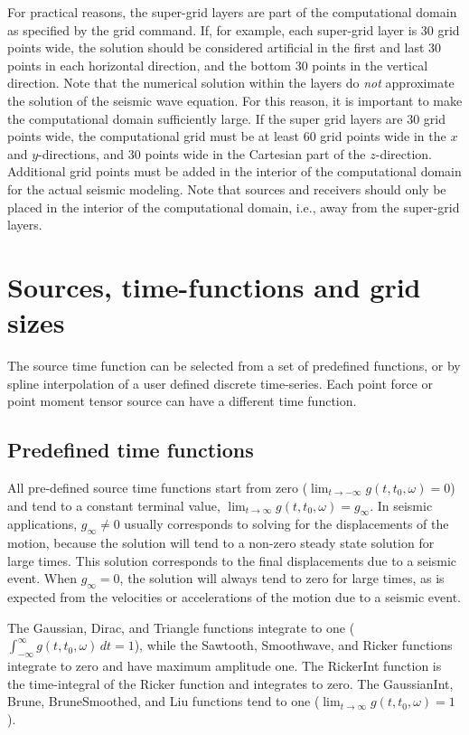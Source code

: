 \documentclass[11pt]{report}
\begin{document}
For practical reasons, the super-grid layers are part of the computational domain as specified by
the grid command. If, for example, each super-grid layer is 30 grid points wide, the solution
should be considered artificial in the first and last 30 points in each horizontal direction, and
the bottom 30 points in the vertical direction. Note that the numerical solution within the layers
do {\em not} approximate the solution of the seismic wave equation. For this reason, it is important
to make the computational domain sufficiently large. If the super grid layers are 30 grid points
wide, the computational grid must be at least 60 grid points wide in the $x$ and $y$-directions, and
30 points wide in the Cartesian part of the $z$-direction. Additional grid points must be added in
the interior of the computational domain for the actual seismic modeling. Note that sources and
receivers should only be placed in the interior of the computational domain, i.e., away from the
super-grid layers.

\chapter{Sources, time-functions and grid sizes}

The source time function can be selected from a set of predefined functions, or by spline
interpolation of a user defined discrete time-series. Each point force or point moment tensor source
can have a different time function. 

\section{Predefined time functions}\label{sec:predefined}

All pre-defined source time functions start from zero ($\lim_{t\to -\infty} g(t,t_0,\omega) = 0$) and tend to a constant terminal
value, $\lim_{t\to \infty} g(t,t_0,\omega) = g_\infty$. In seismic applications, $g_\infty\ne 0$
usually corresponds to solving for the displacements of the motion, because the solution will tend to
a non-zero steady state solution for large times. This solution corresponds to the final
displacements due to a seismic event. When $g_\infty = 0$, the solution will always tend to zero for
large times, as is expected from the velocities or accelerations of the motion due to a seismic event.

The Gaussian, Dirac, and Triangle functions integrate to one ($\int_{-\infty}^{\infty}
g(t,t_0,\omega) \, dt = 1$), while the Sawtooth, Smoothwave, and Ricker functions integrate to zero
and have maximum amplitude one. The RickerInt function is the time-integral of the Ricker function
and integrates to zero. The GaussianInt, Brune, BruneSmoothed, and Liu functions tend to one
($\lim_{t\to\infty} g(t,t_0,\omega) = 1$).
\end{document}
